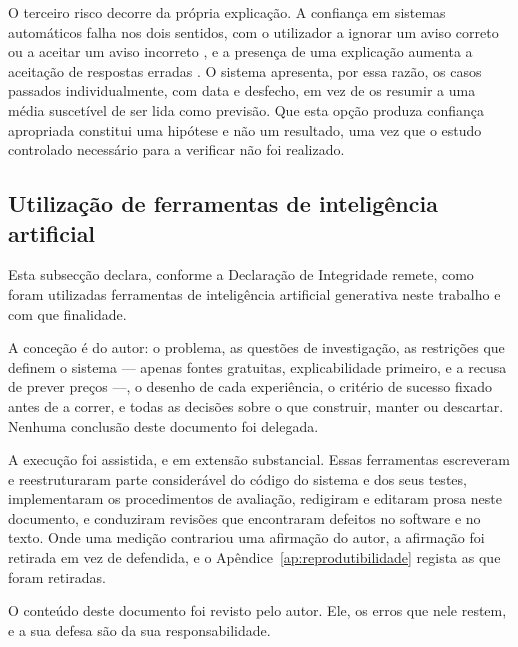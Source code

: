 O terceiro risco decorre da própria explicação. A confiança em sistemas automáticos falha nos dois
sentidos, com o utilizador a ignorar um aviso correto ou a aceitar um aviso incorreto
\autocite{lee2004trust}, e a presença de uma explicação aumenta a aceitação de respostas erradas
\autocite{bansal2021whole}. O sistema apresenta, por essa razão, os casos passados individualmente,
com data e desfecho, em vez de os resumir a uma média suscetível de ser lida como previsão. Que
esta opção produza confiança apropriada constitui uma hipótese e não um resultado, uma vez que o
estudo controlado necessário para a verificar não foi realizado.


\subsection{Utilização de ferramentas de inteligência artificial}
\label{sec:met_ia}

Esta subsecção declara, conforme a Declaração de Integridade remete, como foram utilizadas
ferramentas de inteligência artificial generativa neste trabalho e com que finalidade.

A conceção é do autor: o problema, as questões de investigação, as restrições que definem o
sistema — apenas fontes gratuitas, explicabilidade primeiro, e a recusa de prever preços —, o
desenho de cada experiência, o critério de sucesso fixado antes de a correr, e todas as decisões
sobre o que construir, manter ou descartar. Nenhuma conclusão deste documento foi delegada.

A execução foi assistida, e em extensão substancial. Essas ferramentas escreveram e reestruturaram
parte considerável do código do sistema e dos seus testes, implementaram os procedimentos de
avaliação, redigiram e editaram prosa neste documento, e conduziram revisões que encontraram
defeitos no software e no texto. Onde uma medição contrariou uma afirmação do autor, a afirmação
foi retirada em vez de defendida, e o Apêndice~\ref{ap:reprodutibilidade} regista as que foram
retiradas.

O conteúdo deste documento foi revisto pelo autor. Ele, os erros que nele restem, e a sua defesa
são da sua responsabilidade.